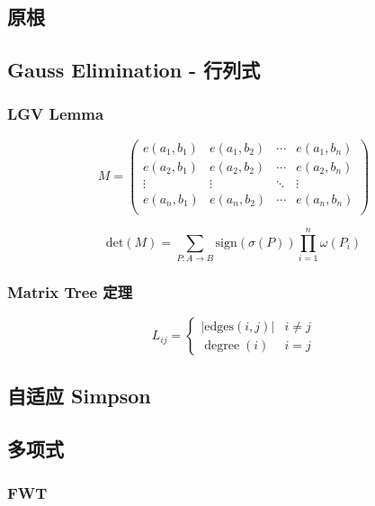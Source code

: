 \documentclass[../template.tex]{subfiles}
\begin{document}
\subsection{原根}


\subsection{Gauss Elimination - 行列式}

	\subsubsection{LGV Lemma}
		\[
		M=
		\begin{pmatrix}
		e(a_1,b_1) & e(a_1,b_2) & \cdots & e(a_1,b_n) \\
		e(a_2,b_1) & e(a_2,b_2) & \cdots & e(a_2,b_n) \\
		\vdots & \vdots & \ddots & \vdots \\
		e(a_n,b_1) & e(a_n,b_2) & \cdots & e(a_n,b_n) \\
		\end{pmatrix}
		\]

		\[
		\mathrm{det}(M)=\sum_{P:A\to B}{\mathrm{sign}(\sigma(P))\prod_{i=1}^{n}\omega(P_i)}
		\]

	\subsubsection{Matrix Tree 定理}
		\[
		L_{ij}=\left\{
			\begin{matrix}
				\vert \text{edges}(i,j)\vert & i\not=j \\
				\operatorname{degree}(i) & i=j
			\end{matrix}
			\right.
		\]

\subsection{自适应 Simpson}

\subsection{多项式}
	\subsubsection{FWT}
\end{document}
